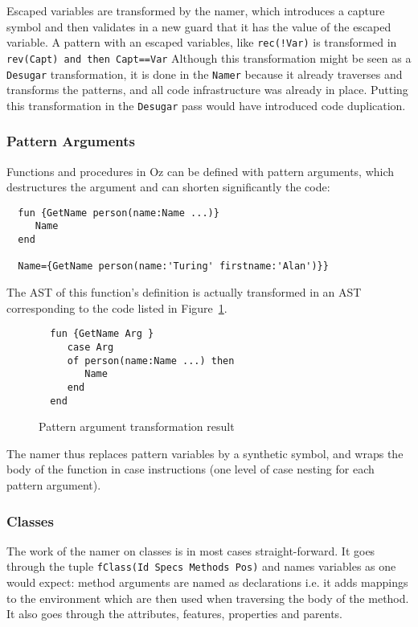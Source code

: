 \documentclass[a4paper]{memoir}
\begin{document}
Escaped variables are transformed by the namer, which introduces a capture
symbol and then validates in a new guard that it has the value of the escaped variable.
 A pattern with an escaped variables, like \lstinline$rec(!Var)$ is
transformed in \lstinline!rev(Capt) and then Capt==Var!
Although this transformation might be seen as a \lstinline!Desugar! transformation, it is
done in the \lstinline!Namer! because it already traverses and transforms the
patterns, and all code infrastructure was already in place. Putting this
transformation in the \lstinline!Desugar! pass would have introduced code duplication.


\subsubsection{Pattern Arguments}
Functions and procedures in Oz can be defined with pattern arguments, which
destructures the argument and can shorten significantly the code:
\begin{lstlisting}
  fun {GetName person(name:Name ...)}
     Name
  end

  Name={GetName person(name:'Turing' firstname:'Alan')}}
\end{lstlisting}

The AST of this function's definition is actually transformed in an AST corresponding to the  code
listed in Figure~\ref{fig:getname2}.
\begin{figure}[h]
\begin{lstlisting}
  fun {GetName Arg }
     case Arg
     of person(name:Name ...) then
        Name
     end
  end
\end{lstlisting}
\caption{Pattern argument transformation result}
\label{fig:getname2}
\end{figure}


The namer thus replaces pattern variables by a synthetic symbol, and wraps the body of the function in case instructions (one level of case nesting for each pattern argument). 




\subsubsection{Classes}\label{sec:arch:namer:classes}
The work of the namer on classes is in most cases straight-forward. It goes through the tuple
\lstinline!fClass(Id Specs Methods Pos)! and names variables as one would expect:
method arguments are named as declarations i.e. it adds mappings to the
environment which are then used when traversing the body of the method.
It also goes through the attributes, features, properties and parents.
\end{document}
